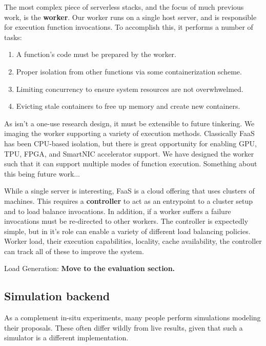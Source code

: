 The most complex piece of serverless stacks, and the focus of much previous work, is the \textbf{worker}.
Our worker runs on a single host server, and is responsible for execution function invocations.
To accomplish this, it performs a number of tasks:
\begin{enumerate}
    \item A function's code must be prepared by the worker.
    \item Proper isolation from other functions via some containerization scheme.
    \item Limiting concurrency to ensure system resources are not overwhwelmed.
    \item Evicting stale containers to free up memory and create new containers.
\end{enumerate}

As \sysname{} isn't a one-use research design, it must be extensible to future tinkering.
We imaging the worker supporting a variety of execution methods.
Classically FaaS has been CPU-based isolation, but there is great opportunity for enabling GPU, TPU, FPGA, and SmartNIC accelerator support.
We have designed the worker such that it can support multiple modes of function execution.
Something about this being future work...

While a single server is interesting, FaaS is a cloud offering that uses clusters of machines.
This requires a \textbf{controller} to act as an entrypoint to a cluster setup and to load balance invocations.
In addition, if a worker suffers a failure invocations must be re-directed to other workers.
The controller is expectedly simple, but in it's role can enable a variety of different load balancing policies.
Worker load, their execution capabilities, locality, cache availability, the controller can track all of these to improve the system.

Load Generation: \textbf{Move to the evaluation section.} 


\subsection{Simulation backend}

As a complement in-situ experiments, many people perform simulations modeling their proposals.
These often differ wildly from live results, given that such a simulator is a different implementation.

